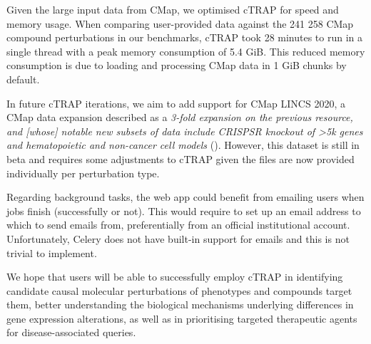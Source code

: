 Given the large input data from CMap, we optimised cTRAP for speed and memory usage. When comparing user-provided data against the 241 258 CMap compound perturbations in our benchmarks, cTRAP took 28 minutes to run in a single thread with a peak memory consumption of 5.4 GiB. This reduced memory consumption is due to loading and processing CMap data in 1 GiB chunks by default.

In future cTRAP iterations, we aim to add support for CMap LINCS 2020, a CMap data expansion described as a \emph{3-fold expansion on the previous resource, and [whose] notable new subsets of data include CRISPSR knockout of \textgreater 5k genes and hematopoietic and non-cancer cell models} (). However, this dataset is still in beta and requires some adjustments to cTRAP given the files are now provided individually per perturbation type.

Regarding background tasks, the web app could benefit from emailing users when jobs finish (successfully or not). This would require to set up an email address to which to send emails from, preferentially from an official institutional account. Unfortunately, Celery does not have built-in support for emails and this is not trivial to implement.

We hope that users will be able to successfully employ cTRAP in identifying candidate causal molecular perturbations of phenotypes and compounds target them, better understanding the biological mechanisms underlying differences in gene expression alterations, as well as in prioritising targeted therapeutic agents for disease-associated queries.
